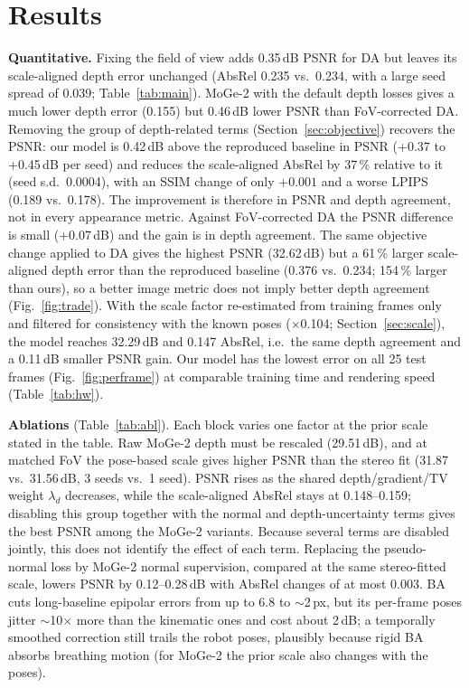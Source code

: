 \documentclass[conference]{IEEEtran}
\begin{document}
\section{Results}
\textbf{Quantitative.} Fixing the field of view adds 0.35\,dB PSNR for DA but leaves its scale-aligned depth error unchanged (AbsRel 0.235 vs.\ 0.234, with a large seed spread of 0.039; Table~\ref{tab:main}). MoGe-2 with the default depth losses gives a much lower depth error (0.155) but 0.46\,dB lower PSNR than FoV-corrected DA. Removing the group of depth-related terms (Section~\ref{sec:objective}) recovers the PSNR: our model is 0.42\,dB above the reproduced baseline in PSNR (+0.37 to +0.45\,dB per seed) and reduces the scale-aligned AbsRel by 37\,\% relative to it (seed s.d.\ 0.0004), with an SSIM change of only $+0.001$ and a worse LPIPS (0.189 vs.\ 0.178). The improvement is therefore in PSNR and depth agreement, not in every appearance metric. Against FoV-corrected DA the PSNR difference is small (+0.07\,dB) and the gain is in depth agreement. The same objective change applied to DA gives the highest PSNR (32.62\,dB) but a 61\,\% larger scale-aligned depth error than the reproduced baseline (0.376 vs.\ 0.234; 154\,\% larger than ours), so a better image metric does not imply better depth agreement (Fig.~\ref{fig:trade}). With the scale factor re-estimated from training frames only and filtered for consistency with the known poses ($\times$0.104; Section~\ref{sec:scale}), the model reaches 32.29\,dB and 0.147 AbsRel, i.e.\ the same depth agreement and a 0.11\,dB smaller PSNR gain. Our model has the lowest error on all 25 test frames (Fig.~\ref{fig:perframe}) at comparable training time and rendering speed (Table~\ref{tab:hw}).

\textbf{Ablations} (Table~\ref{tab:abl}). Each block varies one factor at the prior scale stated in the table. Raw MoGe-2 depth must be rescaled (29.51\,dB), and at matched FoV the pose-based scale gives higher PSNR than the stereo fit (31.87 vs.\ 31.56\,dB, 3 seeds vs.\ 1 seed). PSNR rises as the shared depth/gradient/TV weight $\lambda_d$ decreases, while the scale-aligned AbsRel stays at 0.148--0.159; disabling this group together with the normal and depth-uncertainty terms gives the best PSNR among the MoGe-2 variants. Because several terms are disabled jointly, this does not identify the effect of each term. Replacing the pseudo-normal loss by MoGe-2 normal supervision, compared at the same stereo-fitted scale, lowers PSNR by 0.12--0.28\,dB with AbsRel changes of at most 0.003. BA cuts long-baseline epipolar errors from up to 6.8 to $\sim$2\,px, but its per-frame poses jitter $\sim$10$\times$ more than the kinematic ones and cost about 2\,dB; a temporally smoothed correction still trails the robot poses, plausibly because rigid BA absorbs breathing motion (for MoGe-2 the prior scale also changes with the poses).
\end{document}
